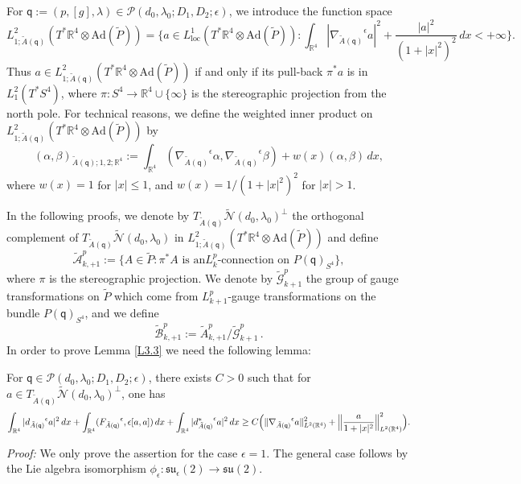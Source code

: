 \documentclass[11pt]{article}
\numberwithin{equation}{section} \setlength{\topmargin}{-35pt}
\newcommand{\PP}{\mathcal{P}}
\newcommand{\R}{\mathbb{R}}
\newcommand{\Ad}{\text{Ad}}
\newcommand{\q}{\mathsf{q}}
\begin{document}
For $\q:=(p,[g],\lambda)\in\PP(d_0,\lambda_0;D_1,D_2;\epsilon)$, we
introduce the function space
\begin{equation*}
L^2_{1;\tilde{A}(\q)}(T^{\ast}\R^4\otimes\Ad(\tilde{P})) =\big\{a\in
L^1_{\text{loc}}(T^{\ast}\R^4\otimes\Ad(\tilde{P})):\int_{\R^4}|{\nabla_{\tilde{A}(\q)}}^{\epsilon}a|^2+
\frac{|a|^2}{(1+|x|^2)^2}\,dx<+\infty\big\}.
\end{equation*}
Thus $a\in L^2_{1;\tilde{A}(\q)}(T^{\ast}\R^4\otimes\Ad(\tilde{P}))$
if and only if its pull-back $\pi^{\ast}a$ is in
$L^2_1(T^{\ast}S^4)$, where $\pi:S^4\to\R^4\cup\{\infty\}$ is the
stereographic projection from the north pole. For technical reasons,
we define the weighted inner product on
$L^2_{1;\tilde{A}(\q)}(T^{\ast}\R^4\otimes\Ad(\tilde{P}))$ by
\begin{equation}
\label{wip}
(\alpha,\beta)_{\tilde{A}(\q);1,2;\R^4}:=\int_{\R^4}({\nabla_{\tilde{A}(\q)}}^{\epsilon}\alpha,{\nabla_{\tilde{A}(\q)}}^{\epsilon}\beta)+
w(x)(\alpha,\beta)\,dx,
\end{equation}
where $w(x)=1$ for $|x|\le 1$, and $w(x)=1/(1+|x|^2)^2$ for $|x|>
1$.

\noindent In the following proofs, we denote by
$T_{\tilde{A}(\q)}\tilde{\mathcal N}(d_0,\lambda_0)^{\perp}$ the
orthogonal complement of $T_{\tilde{A}(\q)}\tilde{\mathcal
N}(d_0,\lambda_0)$ in
$L^2_{1;\tilde{A}(\q)}(T^{\ast}\R^4\otimes\Ad(\tilde{P}))$ and
define
\begin{equation}
\label{AA}
\tilde{\mathcal{A}}^p_{k,+1}:=\{A\in\tilde{P}:\text{$\pi^*A$ is an
$L^p_k$-connection on $P(\q)_{S^4}$}\},
\end{equation}
where $\pi$ is the stereographic projection. We denote by
$\tilde{\mathcal{G}}^p_{k+1}$ the group of gauge transformations on
$\tilde{P}$ which come from $L^p_{k+1}$-gauge transformations on the
bundle $P(\q)_{S^4}$, and we define
\begin{equation}
\label{Btilde}
\tilde{\mathcal{B}}^p_{k,+1}:=\tilde{A}^p_{k,+1}/\tilde{\mathcal{G}}^p_{k+1}\,.
\end{equation}
In order to prove Lemma \ref{L3.3} we need the following lemma:

\begin{lemma}
\label{L3.4} For $\q\in\PP(d_0,\lambda_0;D_1,D_2;\epsilon)$, there
exists $C>0$ such that for $a\in T_{\tilde{A}(\q)} \tilde{\mathcal
N}(d_0,\lambda_0)^{\perp}$, one has
\begin{equation}
\notag
\int_{\R^4}|{d_{\tilde{A}(\q)}}^{\epsilon}a|^2\,dx+\int_{\R^4}({F_{\tilde{A}(\q)}}^{\epsilon},\epsilon[a,a])\,dx+
\int_{\R^4}|{d_{\tilde{A}(\q)}^{\ast}}^{\epsilon}a|^2\,dx \ge
C\Big(\|{\nabla_{\tilde{A}(\q)}}^{\epsilon}a\|^2_{L^2(\R^4)}+\Big\|\frac{a}{1+|x|^2}\Big\|^2_{L^2(\R^4)}\Big).
\end{equation}
\end{lemma}
\textit{Proof:} We only prove the assertion for the case
$\epsilon=1$. The general case follows by the Lie algebra
isomorphism
$\phi_{\epsilon}:\mathfrak{su}_{\epsilon}(2)\to\mathfrak{su}(2)$.
\end{document}

